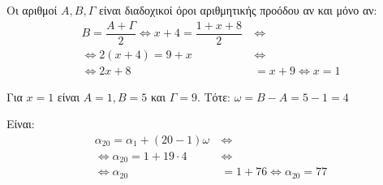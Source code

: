 
\begin{alist}
\item Οι αριθμοί $A, B, \Gamma$ είναι διαδοχικοί όροι αριθμητικής προόδου αν και μόνο αν:
\begin{align*}
B = \dfrac{A + \Gamma}{2} \Leftrightarrow x + 4 = \dfrac{1 + x + 8}{2} \ &\Leftrightarrow \\
\Leftrightarrow 2(x + 4) = 9 + x \ &\Leftrightarrow \\
\Leftrightarrow 2x + 8 &= x + 9 \Leftrightarrow x = 1
\end{align*}

\item
\begin{rlist}
\item Για $x = 1$ είναι $A = 1, B = 5$ και $\Gamma = 9$. Τότε:
$\omega = B - A = 5 - 1 = 4$

\item Είναι:
\begin{align*}
\alpha_{20} = \alpha_1 + (20 - 1)\omega \ &\Leftrightarrow \\
\Leftrightarrow \alpha_{20} = 1 + 19 \cdot 4 \ &\Leftrightarrow \\
\Leftrightarrow \alpha_{20} &= 1 + 76 \Leftrightarrow \alpha_{20} = 77
\end{align*}
\end{rlist}
\end{alist}

